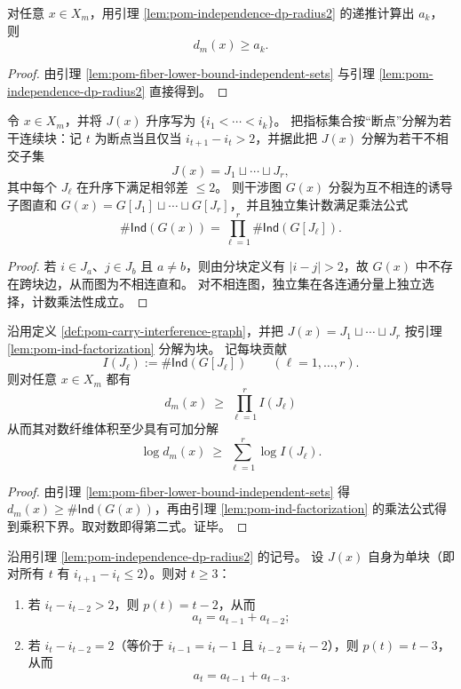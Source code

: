 \begin{corollary}[一个可计算的纤维下界]\label{cor:pom-fiber-lower-bound-dp}
对任意 $x\in X_m$，用引理 \ref{lem:pom-independence-dp-radius2} 的递推计算出 $a_k$，则
\[
d_m(x)\ge a_k.
\]
\end{corollary}

\begin{proof}
由引理 \ref{lem:pom-fiber-lower-bound-independent-sets} 与引理 \ref{lem:pom-independence-dp-radius2} 直接得到。
\end{proof}

\begin{lemma}[干涉图的块分解与独立集乘法公式]\label{lem:pom-ind-factorization}
令 $x\in X_m$，并将 $J(x)$ 升序写为 $\{i_1<\cdots<i_k\}$。
把指标集合按“断点”分解为若干连续块：记 $t$ 为断点当且仅当 $i_{t+1}-i_t>2$，并据此把 $J(x)$ 分解为若干不相交子集
\[
J(x)=J_1\sqcup\cdots\sqcup J_r,
\]
其中每个 $J_\ell$ 在升序下满足相邻差 $\le 2$。
则干涉图 $G(x)$ 分裂为互不相连的诱导子图直和
\(
G(x)=G[J_1]\sqcup\cdots\sqcup G[J_r]
\)，
并且独立集计数满足乘法公式
\[
\#\mathsf{Ind}(G(x))=\prod_{\ell=1}^r \#\mathsf{Ind}(G[J_\ell]).
\]
\end{lemma}

\begin{proof}
若 $i\in J_a$、$j\in J_b$ 且 $a\neq b$，则由分块定义有 $|i-j|>2$，故 $G(x)$ 中不存在跨块边，从而图为不相连直和。
对不相连图，独立集在各连通分量上独立选择，计数乘法性成立。
\end{proof}

\begin{corollary}[纤维下界的块级乘法级联]\label{cor:pom-fiber-lower-bound-cascade}
沿用定义 \ref{def:pom-carry-interference-graph}，并把 $J(x)=J_1\sqcup\cdots\sqcup J_r$ 按引理 \ref{lem:pom-ind-factorization} 分解为块。
记每块贡献
\[
I(J_\ell):=\#\mathsf{Ind}(G[J_\ell])\qquad(\ell=1,\dots,r).
\]
则对任意 $x\in X_m$ 都有
\[
\boxed{\;
d_m(x)\ \ge\ \prod_{\ell=1}^r I(J_\ell)\;}
\]
从而其对数纤维体积至少具有可加分解
\[
\boxed{\;
\log d_m(x)\ \ge\ \sum_{\ell=1}^r \log I(J_\ell).\;}
\]
\end{corollary}
\begin{proof}
由引理 \ref{lem:pom-fiber-lower-bound-independent-sets} 得 $d_m(x)\ge \#\mathsf{Ind}(G(x))$，再由引理 \ref{lem:pom-ind-factorization} 的乘法公式得到乘积下界。取对数即得第二式。证毕。
\end{proof}

\begin{lemma}[单块情形的局部递推：\texorpdfstring{$a_t=a_{t-1}+a_{t-2}$}{a=a+a} 与 \texorpdfstring{$a_t=a_{t-1}+a_{t-3}$}{a=a+a} 的分岔]\label{lem:pom-ind-local-recurrence}
沿用引理 \ref{lem:pom-independence-dp-radius2} 的记号。
设 $J(x)$ 自身为单块（即对所有 $t$ 有 $i_{t+1}-i_t\le 2$）。则对 $t\ge 3$：
\begin{enumerate}
  \item 若 $i_t-i_{t-2}>2$，则 $p(t)=t-2$，从而
  \[
  a_t=a_{t-1}+a_{t-2};
  \]
  \item 若 $i_t-i_{t-2}=2$（等价于 $i_{t-1}=i_t-1$ 且 $i_{t-2}=i_t-2$），则 $p(t)=t-3$，从而
  \[
  a_t=a_{t-1}+a_{t-3}.
  \]
\end{enumerate}
\end{lemma}

